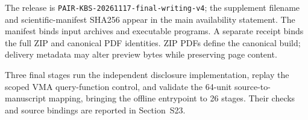 The release is \nolinkurl{PAIR-KBS-20261117-final-writing-v4}; the supplement filename and scientific-manifest SHA256 appear in the main availability statement. The manifest binds input archives and executable programs. A separate receipt binds the full ZIP and canonical PDF identities. ZIP PDFs define the canonical build; delivery metadata may alter preview bytes while preserving page content.

Three final stages run the independent disclosure implementation, replay the scoped VMA query-function control, and validate the 64-unit source-to-manuscript mapping, bringing the offline entrypoint to 26 stages. Their checks and source bindings are reported in Section~S23.
